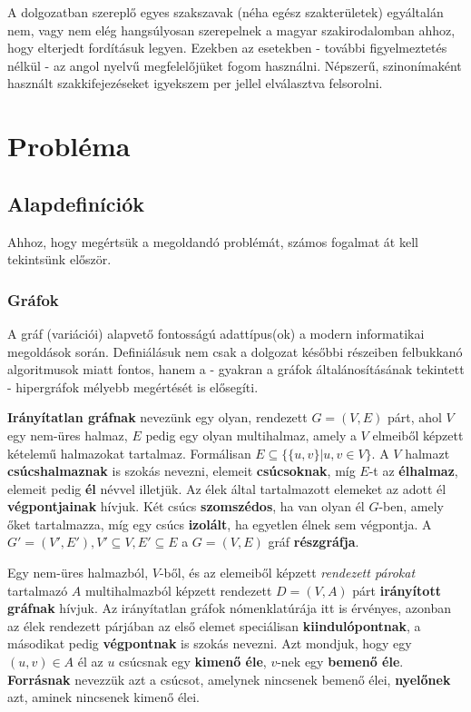 \begin{note}
A dolgozatban szereplő egyes szakszavak (néha egész szakterületek) egyáltalán nem, vagy nem elég hangsúlyosan szerepelnek a magyar szakirodalomban ahhoz, hogy elterjedt fordításuk legyen. Ezekben az esetekben - további figyelmeztetés nélkül - az angol nyelvű megfelelőjüket fogom használni. Népszerű, szinonímaként használt szakkifejezéseket igyekszem per jellel elválasztva felsorolni.
\end{note}

\section{Probléma}

\subsection{Alapdefiníciók}

Ahhoz, hogy megértsük a megoldandó problémát, számos fogalmat át kell tekintsünk először.

\subsubsection{Gráfok}

A gráf (variációi) alapvető fontosságú adattípus(ok) a modern informatikai megoldások során. Definiálásuk nem csak a dolgozat későbbi részeiben felbukkanó algoritmusok miatt fontos, hanem a - gyakran a gráfok általánosításának tekintett - hipergráfok mélyebb megértését is elősegíti. 

\begin{definition}
\textbf{Irányítatlan gráfnak} nevezünk egy olyan, rendezett $G=(V,E)$ párt, ahol $V$ egy nem-üres halmaz, $E$ pedig egy olyan multihalmaz, amely a $V$ elmeiből képzett kételemű halmazokat tartalmaz. Formálisan $E \subseteq \{\{u,v\} | u,v \in V\}$. A $V$ halmazt \textbf{csúcshalmaznak} is szokás nevezni, elemeit \textbf{csúcsoknak}, míg $E$-t az \textbf{élhalmaz}, elemeit pedig \textbf{él} névvel illetjük. Az élek által tartalmazott elemeket az adott él \textbf{végpontjainak} hívjuk. Két csúcs \textbf{szomszédos}, ha van olyan él $G$-ben, amely őket tartalmazza, míg egy csúcs \textbf{izolált}, ha egyetlen élnek sem végpontja. A $G'=(V',E'), V' \subseteq V, E' \subseteq E$ a $G=(V,E)$ gráf \textbf{részgráfja}.
\end{definition}

\begin{definition}
Egy nem-üres halmazból, $V$-ből, és az elemeiből képzett \textit{rendezett párokat} tartalmazó $A$ multihalmazból képzett rendezett $D=(V,A)$ párt \textbf{irányított gráfnak} hívjuk. Az irányítatlan gráfok nómenklatúrája itt is érvényes, azonban az élek rendezett párjában az első elemet speciálisan \textbf{kiindulópontnak}, a másodikat pedig \textbf{végpontnak} is szokás nevezni. Azt mondjuk, hogy egy $(u, v) \in A$ él az $u$ csúcsnak egy \textbf{kimenő éle}, $v$-nek egy \textbf{bemenő éle}. \textbf{Forrásnak} nevezzük azt a csúcsot, amelynek nincsenek bemenő élei, \textbf{nyelőnek} azt, aminek nincsenek kimenő élei.
\end{definition}

